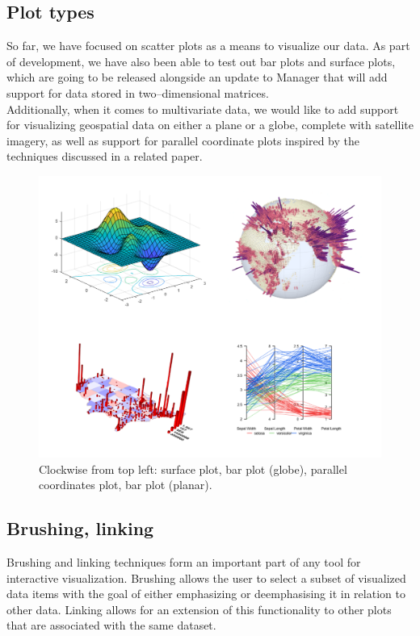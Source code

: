 \documentclass{article}
\begin{document}
\subsection{Plot types}

So far, we have focused on scatter plots as a means to visualize our data. As part of development, we have also been able to test out bar plots and surface plots, which are going to be released alongside an update to Manager that will add support for data stored in two--dimensional matrices.\\

Additionally, when it comes to multivariate data, we would like to add support for visualizing geospatial data on either a plane or a globe, complete with satellite imagery, as well as support for parallel coordinate plots inspired by the techniques discussed in a related paper.\cite{imaxes}

\begin{figure}[!h]
\centering
\includegraphics[scale=0.18]{images/plot_types}
\caption{Clockwise from top left: surface plot, bar plot (globe), parallel coordinates plot, bar plot (planar).}
\label{fig:plottypes}
\end{figure}

\subsection{Brushing, linking}

Brushing and linking techniques form an important part of any tool for interactive visualization. Brushing allows the user to select a subset of visualized data items with the goal of either emphasizing or deemphasising it in relation to other data. Linking allows for an extension of this functionality to other plots that are associated with the same dataset.\cite{linking}
\end{document}
